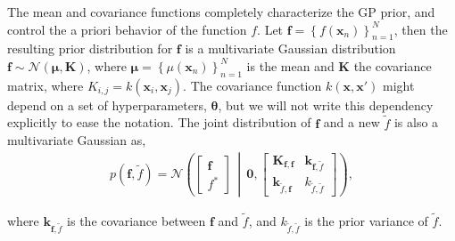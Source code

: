 \documentclass[onecolumn,a4paper,11pt]{article}
\begin{document}
The mean and covariance functions completely characterize the GP prior, and control the a priori behavior of the function $f$. Let $\bm{f}=\left\lbrace f(\bm{x}_n) \right\rbrace_{n=1}^N$, then the resulting prior distribution for $\bm{f}$ is a multivariate Gaussian distribution
$\bm{f} \sim \mathcal{N}(\bm{\mu}, \bm{K})$,
 where $\bm{\mu} = \left\lbrace \mu(\bm{x}_n) \right\rbrace_{n=1}^N$ is the mean and $\bm{K}$ the covariance matrix, where $K_{i,j}=k(\bm{x}_i,\bm{x}_j)$. The covariance function $k(\bm{x}, \bm{x}')$ might depend on a set of hyperparameters, $\bm{\theta}$, but we will not write this dependency explicitly to ease the notation.
The joint distribution of $\bm{f}$ and a new $\tilde{f}$ is also a multivariate Gaussian as,
%
\begin{align*}
p(\bm{f}, \tilde{f})=\mathcal{N} \left( \left[ \begin{array}{cc}
\bm{f} \\ 
f^*
\end{array} \right] \,\middle|\, \bm{0},\left[ \begin{array}{cc}
\bm{K}_{\bm{f},\bm{f}} & \bm{k}_{\bm{f},\tilde{f}} \\ 
\bm{k}_{\tilde{f},\bm{f}} & k_{\tilde{f},\tilde{f}}
\end{array} \right] \right),
\end{align*} 

\noindent where $\bm{k}_{\bm{f},\tilde{f}}$ is the covariance between $\bm{f}$ and $\tilde{f}$, and $k_{\tilde{f},\tilde{f}}$ is the prior variance of $\tilde{f}$. %


 
\end{document}
